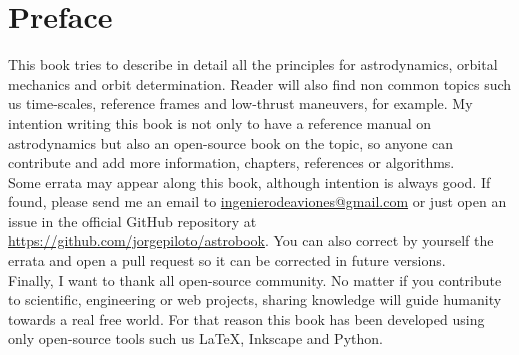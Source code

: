 \section*{Preface}

This book tries to describe in detail all the principles for astrodynamics, orbital mechanics and orbit determination. Reader will also find non common topics such us time-scales, reference frames and low-thrust maneuvers, for example. My intention writing this book is not only to have a reference manual on astrodynamics but also an open-source book on the topic, so anyone can contribute and add more information, chapters, references or algorithms.\\

Some errata may appear along this book, although intention is always good. If found, please send me an email to \href{mailto:ingenierodeaviones@gmail.com}{ingenierodeaviones@gmail.com} or just open an issue in the official GitHub repository at \href{https://github.com/jorgepiloto/astrobook}{https://github.com/jorgepiloto/astrobook}. You can also correct by yourself the errata and open a pull request so it can be corrected in future versions.\\

Finally, I want to thank all open-source community. No matter if you contribute to scientific, engineering or web projects, sharing knowledge will guide humanity towards a real free world. For that reason this book has been developed using only open-source tools such us \LaTeX, Inkscape and Python.